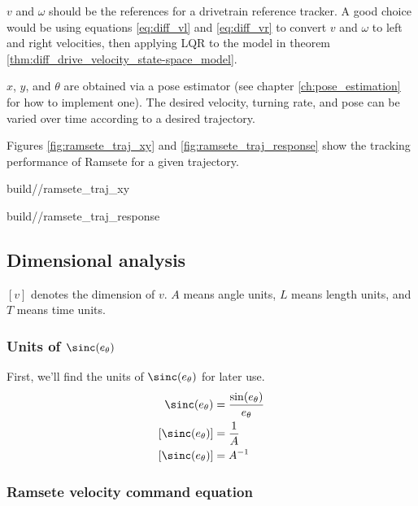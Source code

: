 $v$ and $\omega$ should be the \glspl{reference} for a drivetrain
\gls{reference} tracker. A good choice would be using equations
\eqref{eq:diff_vl} and \eqref{eq:diff_vr} to convert $v$ and $\omega$ to left
and right velocities, then applying LQR to the model in theorem
\ref{thm:diff_drive_velocity_state-space_model}.

$x$, $y$, and $\theta$ are obtained via a \gls{pose} estimator (see chapter
\ref{ch:pose_estimation} for how to implement one). The desired velocity,
turning rate, and \gls{pose} can be varied over time according to a desired
trajectory.

Figures \ref{fig:ramsete_traj_xy} and \ref{fig:ramsete_traj_response} show the
tracking performance of Ramsete for a given trajectory.
\begin{bookfigure}
  \begin{minisvg}{2}{build/\chapterpath/ramsete_traj_xy}
    \caption{Ramsete nonlinear controller x-y plot}
    \label{fig:ramsete_traj_xy}
  \end{minisvg}
  \hfill
  \begin{minisvg}{2}{build/\chapterpath/ramsete_traj_response}
    \caption{Ramsete nonlinear controller response}
    \label{fig:ramsete_traj_response}
  \end{minisvg}
\end{bookfigure}

\subsection{Dimensional analysis}

$[v]$ denotes the dimension of $v$. $A$ means angle units, $L$ means length
units, and $T$ means time units.

\subsubsection{Units of $\sinc(e_\theta)$}

First, we'll find the units of $\sinc(e_\theta)$ for later use.
\begin{align*}
  \sinc(e_\theta) &= \frac{\sin(e_\theta)}{e_\theta} \\
  [\sinc(e_\theta)] &= \frac{1}{A} \\
  [\sinc(e_\theta)] &= A^{-1}
\end{align*}

\subsubsection{Ramsete velocity command equation}

